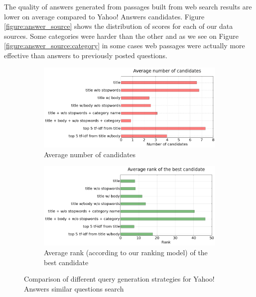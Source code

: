 \documentclass[]{article}
\begin{document}
The quality of answers generated from passages built from web search results are lower on average compared to Yahoo! Answers candidates.
Figure \ref{figure:answer_source} shows the distribution of scores for each of our data sources.
Some categories were harder than the other \cite{liveqa} and as we see on Figure \ref{figure:answer_source:category} in some cases web passages were actually more effective than answers to previously posted questions.

\begin{figure}
\centering
	\begin{subfigure}[b]{0.45\textwidth}
	\includegraphics[width=\textwidth]{img/query_candidate_count}
	\caption{Average number of candidates}
	\label{figure:analysis:query_generation:count}
	\end{subfigure}
	\begin{subfigure}[b]{0.45\textwidth}
	\includegraphics[width=\textwidth]{img/query_candidate_bestrank}
	\caption{Average rank (according to our ranking model) of the best candidate}
	\label{figure:analysis:query_generation:rank}
	\end{subfigure}
	\caption{Comparison of different query generation strategies for Yahoo! Answers similar questions search}
	\label{figure:analysis:query_generation}
\end{figure}
\end{document}
